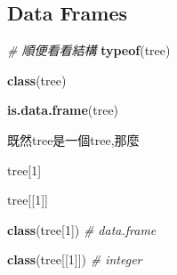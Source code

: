 \documentclass[]{book}
\newenvironment{Shaded}{\begin{snugshade}}{\end{snugshade}}
\newcommand{\KeywordTok}[1]{\textcolor[rgb]{0.13,0.29,0.53}{\textbf{#1}}}
\newcommand{\DecValTok}[1]{\textcolor[rgb]{0.00,0.00,0.81}{#1}}
\newcommand{\CommentTok}[1]{\textcolor[rgb]{0.56,0.35,0.01}{\textit{#1}}}
\newcommand{\NormalTok}[1]{#1}
\theoremstyle{definition}
\theoremstyle{definition}
\theoremstyle{definition}
\theoremstyle{remark}
\begin{document}
\subsection{Data Frames}\label{data-frames}

\begin{Shaded}
\begin{Highlighting}[]
\CommentTok{# 順便看看結構}
\KeywordTok{typeof}\NormalTok{(tree)}
\end{Highlighting}
\end{Shaded}

\begin{Shaded}
\begin{Highlighting}[]
\KeywordTok{class}\NormalTok{(tree)}
\end{Highlighting}
\end{Shaded}

\begin{Shaded}
\begin{Highlighting}[]
\KeywordTok{is.data.frame}\NormalTok{(tree)}
\end{Highlighting}
\end{Shaded}

既然tree是一個tree,那麼

\begin{Shaded}
\begin{Highlighting}[]
\NormalTok{tree[}\DecValTok{1}\NormalTok{]}
\end{Highlighting}
\end{Shaded}

\begin{Shaded}
\begin{Highlighting}[]
\NormalTok{tree[[}\DecValTok{1}\NormalTok{]] }
\end{Highlighting}
\end{Shaded}

\begin{Shaded}
\begin{Highlighting}[]
\KeywordTok{class}\NormalTok{(tree[}\DecValTok{1}\NormalTok{]) }\CommentTok{# data.frame}
\end{Highlighting}
\end{Shaded}

\begin{Shaded}
\begin{Highlighting}[]
\KeywordTok{class}\NormalTok{(tree[[}\DecValTok{1}\NormalTok{]]) }\CommentTok{# integer}
\end{Highlighting}
\end{Shaded}
\end{document}
